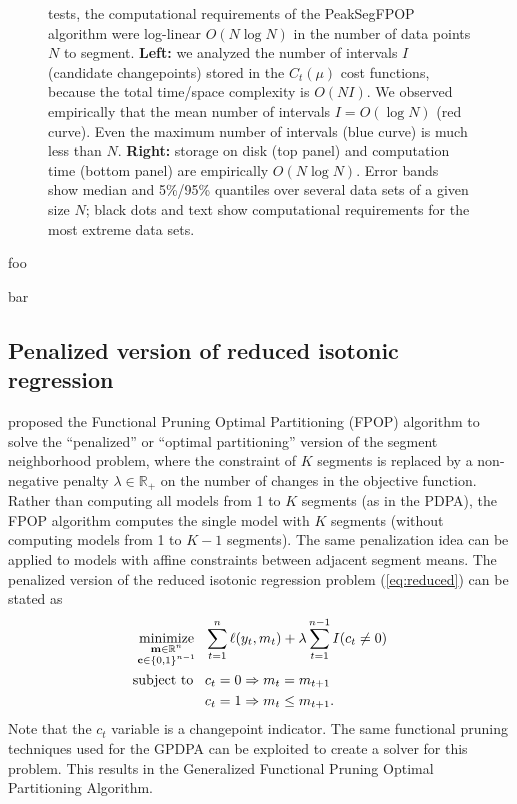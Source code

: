 \documentclass[article]{jss}
\DeclareMathOperator*{\minimize}{minimize}
\newcommand{\RR}{\mathbb R}
\begin{document}
\begin{figure}[t!]
{  tests, the computational requirements of the PeakSegFPOP algorithm
  were log-linear $O(N \log N)$ in the number of data points $N$ to
  segment. \textbf{Left:} we analyzed the number of intervals $I$
  (candidate changepoints) stored in the $C_t(\mu)$ cost functions,
  because the total time/space complexity is $O(NI)$. We observed
  empirically that the mean number of intervals $I=O(\log N)$ (red
  curve). Even the maximum number of intervals (blue curve) is much
  less than $N$. \textbf{Right:} storage on disk (top panel) and
  computation time (bottom panel) are empirically $O(N \log N)$. Error
  bands show median and 5\%/95\% quantiles over several data sets of a
  given size $N$; black dots and text show computational requirements
  for the most extreme data sets.}
\end{figure}
 
\newpage

foo
\newpage

bar
\newpage

\subsection{Penalized version of reduced isotonic regression}

\citet{fpop} proposed the Functional Pruning Optimal Partitioning
(FPOP) algorithm to solve the ``penalized'' or ``optimal
partitioning'' version of the segment neighborhood problem, where the
constraint of $K$ segments is replaced by a non-negative penalty
$\lambda\in\RR_+$ on the number of changes in the objective
function. Rather than computing all models from 1 to $K$ segments (as
in the PDPA), the FPOP algorithm computes the single model with $K$
segments (without computing models from 1 to $K-1$ segments). The same
penalization idea can be applied to models with affine constraints
between adjacent segment means.  The penalized version of the reduced
isotonic regression problem (\ref{eq:reduced}) can be stated as
\begin{align}
  \label{eq:penalized_reduced_isotonic}
  \minimize_{
    \substack{
    \mathbf m\in\RR^n\\
\mathbf c\in\{0,1\}^{n-1}
}
    } &\ \ 
  \sum_{t=1}^n \ell(y_t, m_t) + \lambda \sum_{t=1}^{n-1} I(c_t \neq 0) \\
  \text{subject to\,} &\ \ c_t = 0 \Rightarrow m_t = m_{t+1}
  \nonumber\\
&\ \ c_t = 1 \Rightarrow m_t \leq m_{t+1}.
\nonumber
\nonumber
\end{align}
Note that the $c_t$ variable is a changepoint indicator.  The same
functional pruning techniques used for the GPDPA can be exploited to
create a solver for this problem. This results in the Generalized
Functional Pruning Optimal Partitioning Algorithm.
\end{document}
